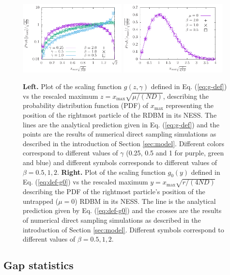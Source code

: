 \documentclass[onecolumn,superscriptaddress,
 amsmath,amssymb,
 aps,
 prd,
]{revtex4-1}
\begin{document}
\begin{figure}[t]
\centering
\includegraphics[width=0.48\textwidth]{max.pdf}\hfill
\includegraphics[width=0.48\textwidth]{max0.pdf}
\caption{{\bf Left.} Plot of the scaling function $g(z, \gamma)$ defined in Eq. (\ref{eq:g-def}) vs the rescaled maximum $z =x_{\max} \sqrt{\mu/(ND)}$, describing the probability distribution function (PDF) of $x_{\max}$ representing the position of the rightmost particle of the RDBM in its NESS. The lines are the analytical prediction given in Eq. (\ref{eq:g-def}) and the points are the results of numerical direct sampling simulations as described in the introduction of Section \ref{sec:model}. Different colors correspond to different values of $\gamma$ (0.25, 0.5 and 1 for purple, green and blue) and different symbols corresponds to different values of $\beta = 0.5,1,2$. {\bf Right.} Plot of the scaling function $g_0(y)$ defined in Eq. (\ref{eq:def-g0}) vs the rescaled maximum $y=x_{\max}\sqrt{r/(4 ND)}$ describing the PDF of the rightmost particle's position of the untrapped ($\mu = 0$) RDBM in its NESS. The line is the analytical prediction given by Eq. (\ref{eq:def-g0}) and the crosses are the results of numerical direct sampling simulations as described in the introduction of Section \ref{sec:model}. Different symbols correspond to different values of $\beta=0.5,1,2$.}\label{fig:max}
\end{figure}

\subsection{Gap statistics} \label{sec:model-gap}
\end{document}
